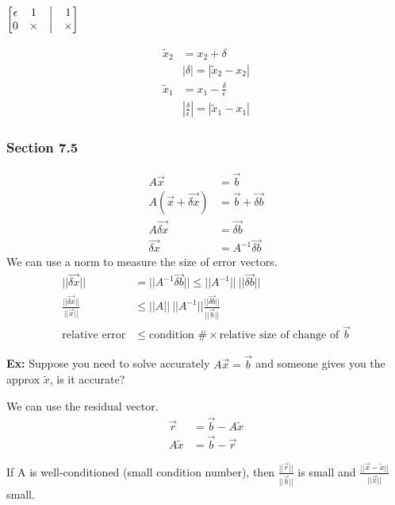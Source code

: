 \documentclass[12pt, letterpaper]{article}
\begin{document}
\begin{center}$\begin{bmatrix}
    \epsilon & 1 & \bigl{|} & 1\\
    0 & \times & \bigl{|} & \times
\end{bmatrix}$\end{center}
\begin{align*}
    \tilde{x}_2 &= x_2 + \delta \\
    & |\delta| = |\tilde{x}_2-x_2| \\
    \tilde{x}_1 &= x_1 - \frac{\delta}{\epsilon} \\
    & \left|\frac{\delta}{\epsilon}\right| = |\tilde x_1 - x_1|
\end{align*}

\subsubsection{Section 7.5}
\begin{align*}
    A\vec x &= \vec b \\
    A(\vec x + \vec{\delta x}) &= \vec b + \vec{\delta b} \\
    A\vec{\delta x} &= \vec{\delta b} \\
    \vec{\delta x} &= A^{-1} \vec{\delta b}
\end{align*}
We can use a norm to measure the size of error vectors.
\begin{align*}
    ||\vec{\delta x}|| &= ||A^{-1} \vec{\delta b}|| \le ||A^{-1}||\ ||\vec{\delta b}|| \\
    \frac{||\vec {\delta x}||}{||\vec x||} &\le || A ||\ ||A^{-1}|| \frac{||\vec{\delta b}||}{||\vec b||} \\
    \text{relative error} &\le \text{condition }\# \times \text{relative size of change of }\vec{b}
\end{align*}

\noindent \textbf{Ex: } Suppose you need to solve accurately $A\vec x = \vec b$ and someone gives you the approx $\tilde x$, is it accurate?

We can use the residual vector.
\begin{align*}
    \vec r &= \vec b - A\tilde x \\ 
    A\tilde x &= \vec b - \vec r 
\end{align*}

If A is well-conditioned (small condition number), then  
$\frac{||\vec r||}{||\vec b||}$ is small and $\frac{||\vec x - \tilde x||}{||\vec x||}$ small.
\end{document}
